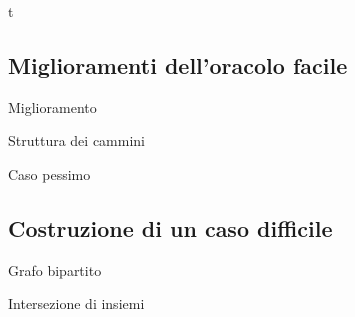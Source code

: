 t \documentclass{beamer}
\theoremstyle{plain}
\theoremstyle{definition}
\theoremstyle{remark}
\begin{document}
\subsection{Miglioramenti dell'oracolo facile}

\begin{frame}{Miglioramento}
  
\end{frame}

\begin{frame}{Struttura dei cammini}
  
\end{frame}

\begin{frame}{Caso pessimo}
  
\end{frame}

\subsection{Costruzione di un caso difficile}

\begin{frame}{Grafo bipartito}
  
\end{frame}

\begin{frame}{Intersezione di insiemi}
  
\end{frame}
\end{document}
